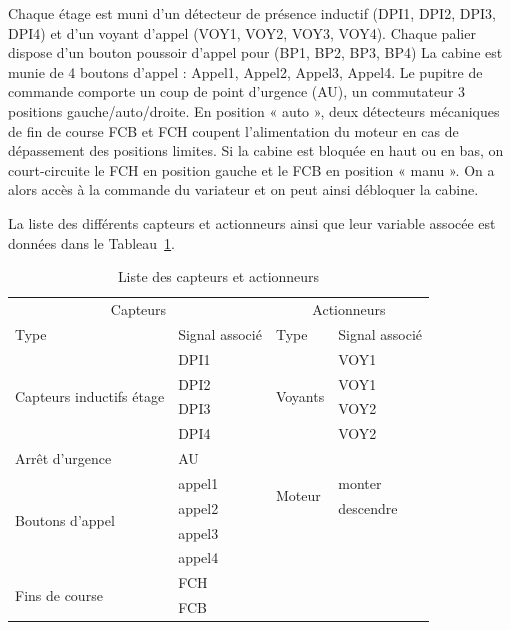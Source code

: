 \documentclass[11pt, multicol]{article}
\begin{document}
Chaque étage est muni d’un détecteur de présence inductif (DPI1, DPI2, DPI3, DPI4) et d’un
voyant d’appel (VOY1, VOY2, VOY3, VOY4).
Chaque palier dispose d’un bouton poussoir d’appel pour (BP1, BP2, BP3, BP4)
La cabine est munie de 4 boutons d’appel : Appel1, Appel2, Appel3, Appel4.
Le pupitre de commande comporte un coup de point d’urgence (AU), un commutateur 3 positions
gauche/auto/droite. En position « auto », deux détecteurs mécaniques de fin de course FCB et
FCH coupent l’alimentation du moteur en cas de dépassement des positions limites. Si la cabine
est bloquée en haut ou en bas, on court-circuite le FCH en position gauche et le FCB en position
« manu ». On a alors accès à la commande du variateur et on peut ainsi débloquer la cabine.


La liste des différents capteurs et actionneurs ainsi que leur variable assocée est données dans le Tableau~\ref{tab:capteursActionneurs}.

\begin{table}[ht]
\centering
	\begin{tabular}{|ll || ll|}
	\hline
		\multicolumn{2}{|c||}{Capteurs} 				    & \multicolumn{2}{c|}{Actionneurs}                        \\
		Type                                        & Signal associé & Type                     & Signal associé    \\\hline
		\multirow{4}{*}{Capteurs inductifs étage}   & DPI1           & \multirow{4}{*}{Voyants} & VOY1              \\
		                                            & DPI2           &                          & VOY1              \\
		                                            & DPI3           &                          & VOY2              \\
																						    & DPI4		       &                          & VOY2              \\\hline
  	Arrêt d'urgence										          & AU					   &                          & 		              \\\hline
		\multirow{4}{*}{Boutons d'appel}            & appel1         & \multirow{2}{*}{Moteur}  & monter            \\
		                                            & appel2         &                          & descendre         \\\cline{3-4}
																								& appel3         &                          &                   \\
																								& appel4 			 & 													& 									\\\cline{1-2}
		\multirow{2}{*}{Fins de course}             & FCH            &                          &                   \\
																							  & FCB            &                          &                   \\\hline
	\end{tabular}
	\caption{Liste des capteurs et actionneurs}
	\label{tab:capteursActionneurs}
\end{table}
\end{document}
